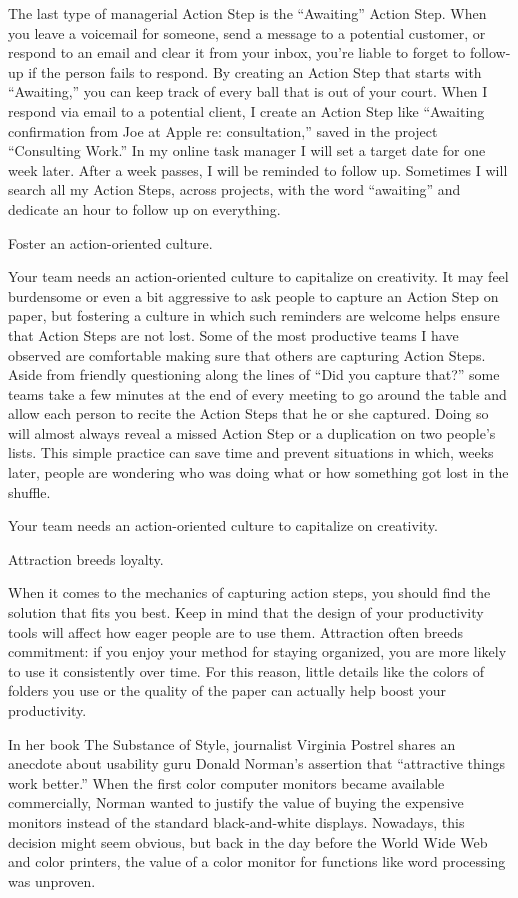 The last type of managerial Action Step is the “Awaiting” Action Step. When you leave a voicemail for someone, send a message to a potential customer, or respond to an email and clear it from your inbox, you’re liable to forget to follow-up if the person fails to respond. By creating an Action Step that starts with “Awaiting,” you can keep track of every ball that is out of your court. When I respond via email to a potential client, I create an Action Step like “Awaiting confirmation from Joe at Apple re: consultation,” saved in the project “Consulting Work.” In my online task manager I will set a target date for one week later. After a week passes, I will be reminded to follow up. Sometimes I will search all my Action Steps, across projects, with the word “awaiting” and dedicate an hour to follow up on everything.

Foster an action-oriented culture.

Your team needs an action-oriented culture to capitalize on creativity. It may feel burdensome or even a bit aggressive to ask people to capture an Action Step on paper, but fostering a culture in which such reminders are welcome helps ensure that Action Steps are not lost. Some of the most productive teams I have observed are comfortable making sure that others are capturing Action Steps. Aside from friendly questioning along the lines of “Did you capture that?” some teams take a few minutes at the end of every meeting to go around the table and allow each person to recite the Action Steps that he or she captured. Doing so will almost always reveal a missed Action Step or a duplication on two people’s lists. This simple practice can save time and prevent situations in which, weeks later, people are wondering who was doing what or how something got lost in the shuffle.

Your team needs an action-oriented culture to capitalize on creativity.

Attraction breeds loyalty.

When it comes to the mechanics of capturing action steps, you should find the solution that fits you best. Keep in mind that the design of your productivity tools will affect how eager people are to use them. Attraction often breeds commitment: if you enjoy your method for staying organized, you are more likely to use it consistently over time. For this reason, little details like the colors of folders you use or the quality of the paper can actually help boost your productivity.

In her book The Substance of Style, journalist Virginia Postrel shares an anecdote about usability guru Donald Norman’s assertion that “attractive things work better.” When the first color computer monitors became available commercially, Norman wanted to justify the value of buying the expensive monitors instead of the standard black-and-white displays. Nowadays, this decision might seem obvious, but back in the day before the World Wide Web and color printers, the value of a color monitor for functions like word processing was unproven.

